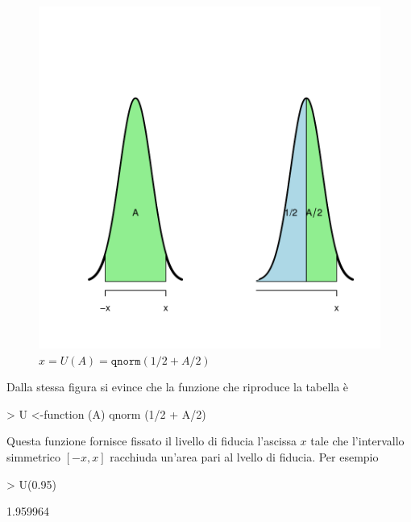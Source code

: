 \documentclass[onecolumn,12pt]{book}
\begin{document}
\begin{figure}[H]
\includegraphics{RbookParte2-154}
\caption{$x=U(A)=\texttt{qnorm}(1/2+A/2)$}
\label{fig:fig12code}
\end{figure}
Dalla stessa figura  si evince che la funzione che riproduce la tabella è
\begin{Schunk}
\begin{Sinput}
> U <-function (A) qnorm (1/2 + A/2)
\end{Sinput}
\end{Schunk}
Questa funzione fornisce fissato il livello di fiducia l'ascissa $x$  tale che l'intervallo simmetrico $[-x,x]$ racchiuda un'area pari al lvello di fiducia. Per esempio
\begin{Schunk}
\begin{Sinput}
> U(0.95)
\end{Sinput}
\begin{Soutput}
[1] 1.959964
\end{Soutput}
\end{Schunk}
\end{document}

